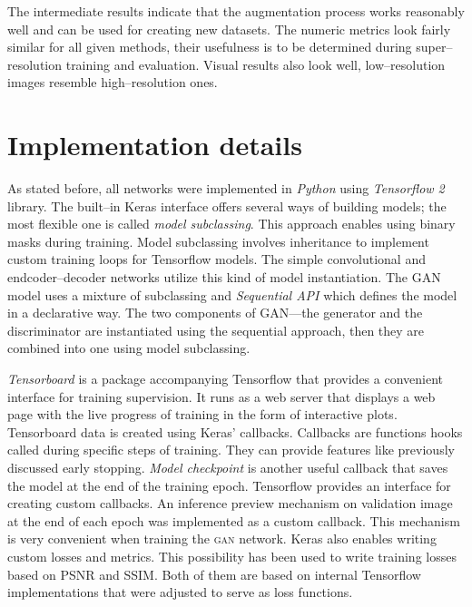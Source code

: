 The intermediate results indicate that the augmentation process works reasonably well and can be used for creating new datasets.
The numeric metrics look fairly similar for all given methods, their usefulness is to be determined during super--resolution training and evaluation.
Visual results also look well, low--resolution images resemble high--resolution ones.

\section{Implementation details}
As stated before, all networks were implemented in \textit{Python} using \textit{Tensorflow 2} library.
The built--in Keras interface offers several ways of building models; the most flexible one is called \textit{model subclassing}.
This approach enables using binary masks during training.
Model subclassing involves inheritance to implement custom training loops for Tensorflow models.
The simple convolutional and endcoder--decoder networks utilize this kind of model instantiation.
The GAN model uses a mixture of subclassing and \textit{Sequential API} which defines the model in a declarative way.
The two components of GAN---the generator and the discriminator are instantiated using the sequential approach, then they are combined into one using model subclassing.

\textit{Tensorboard} is a package accompanying Tensorflow that provides a convenient interface for training supervision.
It runs as a web server that displays a web page with the live progress of training in the form of interactive plots.
Tensorboard data is created using Keras' callbacks.
Callbacks are functions hooks called during specific steps of training.
They can provide features like previously discussed early stopping.
\textit{Model checkpoint} is another useful callback that saves the model at the end of the training epoch.
Tensorflow provides an interface for creating custom callbacks.
An inference preview mechanism on validation image at the end of each epoch was implemented as a custom callback.
This mechanism is very convenient when training the \textsc{gan} network.
Keras also enables writing custom losses and metrics.
This possibility has been used to write training losses based on PSNR and SSIM.
Both of them are based on internal Tensorflow implementations that were adjusted to serve as loss functions.